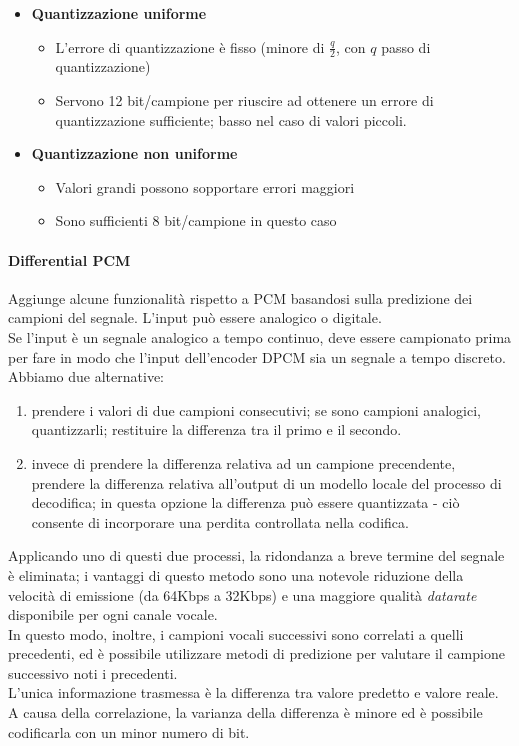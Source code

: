 \begin{itemize}
	\item \textbf{Quantizzazione uniforme}	
	\begin{itemize}
		\item L'errore di quantizzazione è fisso (minore di $ \frac{q}{2} $, con $ q $ passo di quantizzazione)
		\item Servono 12 bit/campione per riuscire ad ottenere un errore di quantizzazione sufficiente; basso nel caso di valori piccoli.
	\end{itemize}
	\item \textbf{Quantizzazione non uniforme}
	\begin{itemize}
		\item Valori grandi possono sopportare errori maggiori
		\item Sono sufficienti 8 bit/campione in questo caso
	\end{itemize}
\end{itemize}

\paragraph{Differential PCM}
Aggiunge alcune funzionalità rispetto a PCM basandosi sulla predizione dei campioni del segnale. L'input può essere analogico o digitale.\\
Se l'input è un segnale analogico a tempo continuo, deve essere campionato prima per fare in modo che l'input dell'encoder DPCM sia un segnale a tempo discreto.\\
Abbiamo due alternative:
\begin{enumerate}
	\item prendere i valori di due campioni consecutivi; se sono campioni analogici, quantizzarli; restituire la differenza tra il primo e il secondo.
	\item invece di prendere la differenza relativa ad un campione precendente, prendere la differenza relativa all'output di un modello locale del processo di decodifica; in questa opzione la differenza può essere quantizzata - ciò consente di incorporare una perdita controllata nella codifica.
\end{enumerate}
Applicando uno di questi due processi, la ridondanza a breve termine del segnale è eliminata; i vantaggi di questo metodo sono una notevole riduzione della velocità di emissione (da 64Kbps a 32Kbps) e  una maggiore qualità \textit{datarate} disponibile per ogni canale vocale.\\
In questo modo, inoltre, i campioni vocali successivi sono correlati a quelli precedenti, ed è possibile utilizzare metodi di predizione per valutare il campione successivo noti i precedenti.\\
L'unica informazione trasmessa è la differenza tra valore predetto e valore reale. A causa della correlazione, la varianza della differenza è minore ed è possibile codificarla con un minor numero di bit.\\

